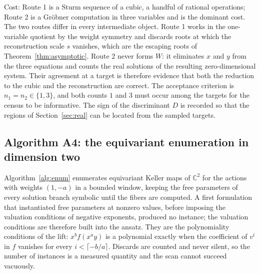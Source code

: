 \documentclass[11pt]{article}
\theoremstyle{definition}
\theoremstyle{remark}
\newcommand{\C}{\mathbb{C}}
\begin{document}
Cost: Route 1 is a Sturm sequence of a cubic, a handful of rational operations; Route 2 is a Gr\"obner computation in three variables and is the dominant cost. The two routes differ in every intermediate object. Route 1 works in the one-variable quotient by the weight symmetry and discards roots at which the reconstruction scale $s$ vanishes, which are the escaping roots of Theorem~\ref{thm:asymptotic}. Route 2 never forms $W$: it eliminates $x$ and $y$ from the three equations and counts the real solutions of the resulting zero-dimensional system. Their agreement at a target is therefore evidence that both the reduction to the cubic and the reconstruction are correct. The acceptance criterion is $n_1 = n_2 \in \{1,3\}$, and both counts $1$ and $3$ must occur among the targets for the census to be informative. The sign of the discriminant $D$ is recorded so that the regions of Section~\ref{sec:real} can be located from the sampled targets.

\subsection{Algorithm A4: the equivariant enumeration in dimension two}

Algorithm~\ref{alg:enum} enumerates equivariant Keller maps of $\C^2$ for the actions with weights $(1,-a)$ in a bounded window, keeping the free parameters of every
solution branch symbolic until the fibers are computed. A first formulation that instantiated free parameters at nonzero values, before imposing the valuation conditions of negative exponents,
produced no instance; the valuation conditions are therefore built into the ansatz. They are the polynomiality conditions of the lift: $x^{b}f(x^ay)$ is a polynomial exactly when the coefficient of $v^i$ in $f$ vanishes for every $i < \lceil -b/a \rceil$. Discards are counted and never silent, so the number of instances is a measured quantity and the scan cannot succeed vacuously.
\end{document}
